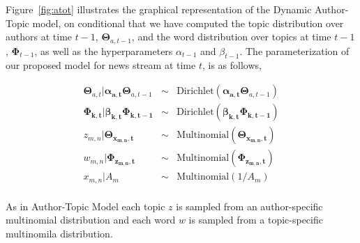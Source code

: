 Figure~\ref{fig:atot} illustrates the graphical representation of the Dynamic Author-Topic model, on conditional that we have computed the topic distribution over authors at time $t-1$, $\boldsymbol{\Theta}_{a,t-1}$, and the word distribution over topics at time $t-1$, $\boldsymbol{\Phi}_{t-1}$, as well as the hyperparameters $\alpha_{t-1}$ and  $\beta_{t-1}$. The parameterization of our proposed model for news stream  at time $t$, is as follows,

\begin{eqnarray*} \label{eq:dat}
\boldsymbol{\Theta}_{a,t} | \boldsymbol{\alpha_{a,t}}
\boldsymbol{\Theta}_{a,t-1}
& \sim & \text{Dirichlet}({\boldsymbol{\alpha_{a,t}}
\boldsymbol{\Theta}_{a,t-1}})\\
\boldsymbol{\Phi_{k,t}} | \boldsymbol{\beta_{k,t}}\boldsymbol{\Phi_{k,t-1}} & \sim & \text{Dirichlet}(\boldsymbol{\beta_{k,t}}\boldsymbol{\Phi_{k,t-1}})\\
z_{m,n} | \boldsymbol{\Theta_{x_{m,n},t}} & \sim & \text{Multinomial}(\boldsymbol{\Theta_{x_{m,n},t}})\\
w_{m,n} | \boldsymbol{\Phi_{z_{m,n},t}} & \sim & \text{Multinomial}(\boldsymbol{\Phi_{z_{m,n},t}})\\
x_{m,n} | {A_{m}} & \sim & \text{Multinomial}(1/A_m)\\

\end{eqnarray*}

As in Author-Topic Model each topic $z$ is sampled from an author-specific multinomial distribution and each word $w$ is sampled from a topic-specific multinomila distribution.

